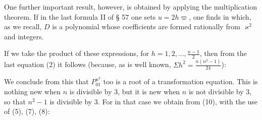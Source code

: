 
One further important result, however, is obtained by applying the multiplication theorem. If in the last formula II of § 57 one sets $u = 2h\varpi$, one finds
in which, as we recall, $D$ is a polynomial whose coefficients are formed rationally from $\varkappa^2$ and integers.

If we take the product of these expressions, for $h = 1, 2, \ldots, \frac{n-1}{2}$, then from the last equation (2) it follows (because, as is well known, $\Sigma h^2 = \frac{n(n^2-1)}{24}$):

We conclude from this that $P_{01}^{n^2}$ too is a root of a transformation equation. This is nothing new when $n$ is divisible by 3, but it is new when $n$ is not divisible by 3, so that $n^2 - 1$ is divisible by 3. For in that case we obtain from (10), with the use of (5), (7), (8):
